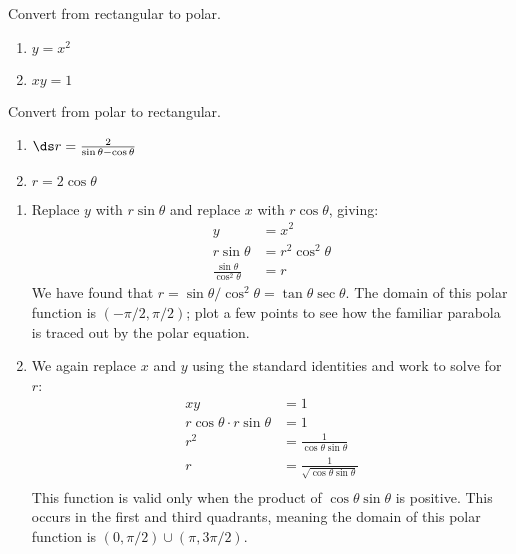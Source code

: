 \begin{example}\label{ex_polar6}
\begin{minipage}[t]{.5\linewidth}
Convert from rectangular to polar.
\begin{enumerate}
	\item $y=x^2$
	\item $xy = 1$
\end{enumerate}
\end{minipage}%
\begin{minipage}[t]{.5\linewidth}
Convert from polar to rectangular.
\begin{enumerate}\addtocounter{enumi}{2}
	\item $\ds r=\frac{2}{\sin \theta-\cos\theta}$
	\item $r=2\cos \theta$
\end{enumerate}
\end{minipage}
\solution
\begin{enumerate}
	\item Replace $y$ with $r\sin\theta$ and replace $x$ with $r\cos\theta$, giving:
	\begin{align*}
	y &=x^2\\
	r\sin\theta &= r^2\cos^2\theta\\
	\frac{\sin\theta}{\cos^2\theta} &= r
	\end{align*}
	We have found that $r=\sin\theta/\cos^2\theta = \tan\theta\sec\theta$. The domain of this polar function is $(-\pi/2,\pi/2)$; plot a few points to see how the familiar parabola is traced out by the polar equation.
	
	\item		We again replace $x$ and $y$ using the standard identities and work to solve for $r$:
	\begin{align*}
	xy &= 1 \\
	r\cos\theta\cdot r\sin\theta & = 1\\
	r^2 & = \frac{1}{\cos\theta\sin\theta}\\
	r & = \frac{1}{\sqrt{\cos\theta\sin\theta}}\\
	\end{align*}
%
%
%
	This function is valid only when the product of $\cos\theta\sin\theta$ is positive. This occurs in the first and third quadrants, meaning the domain of this polar function is $(0,\pi/2) \cup (\pi,3\pi/2)$.
	

\end{enumerate}
\end{example}
